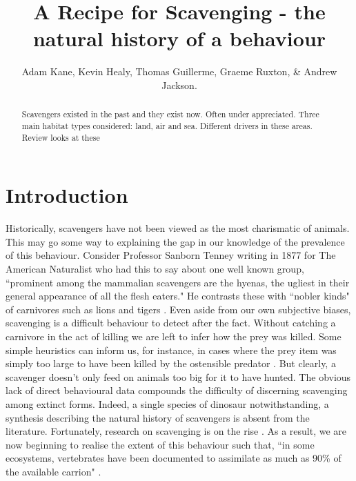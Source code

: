 \documentclass[a4paper,12pt]{article}
\title{A Recipe for Scavenging - the natural history of a behaviour}
\author{Adam Kane, Kevin Healy, Thomas Guillerme, Graeme Ruxton, \& Andrew Jackson.}
\begin{document}
\maketitle


\begin{abstract}
 Scavengers existed in the past and they exist now. 
 Often under appreciated. 
 Three main habitat types considered: land, air and sea. 
 Different drivers in these areas. 
 Review looks at these 
\end{abstract}

\newpage


\section*{Introduction}
Historically, scavengers have not been viewed as the most charismatic of animals.
This may go some way to explaining the gap in our knowledge of the prevalence of this behaviour.
Consider Professor Sanborn Tenney writing in 1877 for The American Naturalist who had this to say about one well known group, ``prominent among the mammalian scavengers are the hyenas, the ugliest in their general appearance of all the flesh eaters."
He contrasts these with ``nobler kinds" of carnivores such as lions and tigers \citep{tenney1877few}.
Even aside from our own subjective biases, scavenging is a difficult behaviour to detect after the fact.
Without catching a carnivore in the act of killing we are left to infer how the prey was killed.
Some simple heuristics can inform us, for instance, in cases where the prey item was simply too large to have been killed by the ostensible predator \citep{pobiner2008paleoecological}.
But clearly, a scavenger doesn’t only feed on animals too big for it to have hunted.
The obvious lack of direct behavioural data compounds the difficulty of discerning scavenging among extinct forms.
Indeed, a single species of dinosaur notwithstanding, a synthesis describing the natural history of scavengers is absent from the literature.
Fortunately, research on scavenging is on the rise \citep{manga2006vulture}.
As a result, we are now beginning to realise the extent of this behaviour such that, ``in some ecosystems, vertebrates have been documented to assimilate as much as 90\% of the available carrion" \citep{beasley2015vertebrates}.
\end{document}
